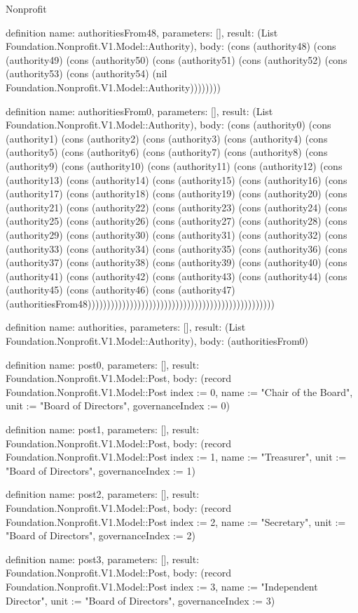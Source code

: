 \begin{lexlean}{Nonprofit}
\begin{semanticmodule}
definition{
  name: authoritiesFrom48,
  parameters: [],
  result: (List Foundation.Nonprofit.V1.Model::Authority),
  body: (cons (authority48) (cons (authority49) (cons (authority50) (cons (authority51) (cons (authority52) (cons (authority53) (cons (authority54) (nil Foundation.Nonprofit.V1.Model::Authority))))))))
}

definition{
  name: authoritiesFrom0,
  parameters: [],
  result: (List Foundation.Nonprofit.V1.Model::Authority),
  body: (cons (authority0) (cons (authority1) (cons (authority2) (cons (authority3) (cons (authority4) (cons (authority5) (cons (authority6) (cons (authority7) (cons (authority8) (cons (authority9) (cons (authority10) (cons (authority11) (cons (authority12) (cons (authority13) (cons (authority14) (cons (authority15) (cons (authority16) (cons (authority17) (cons (authority18) (cons (authority19) (cons (authority20) (cons (authority21) (cons (authority22) (cons (authority23) (cons (authority24) (cons (authority25) (cons (authority26) (cons (authority27) (cons (authority28) (cons (authority29) (cons (authority30) (cons (authority31) (cons (authority32) (cons (authority33) (cons (authority34) (cons (authority35) (cons (authority36) (cons (authority37) (cons (authority38) (cons (authority39) (cons (authority40) (cons (authority41) (cons (authority42) (cons (authority43) (cons (authority44) (cons (authority45) (cons (authority46) (cons (authority47) (authoritiesFrom48)))))))))))))))))))))))))))))))))))))))))))))))))
}

definition{
  name: authorities,
  parameters: [],
  result: (List Foundation.Nonprofit.V1.Model::Authority),
  body: (authoritiesFrom0)
}

definition{
  name: post0,
  parameters: [],
  result: Foundation.Nonprofit.V1.Model::Post,
  body: (record Foundation.Nonprofit.V1.Model::Post {index := 0, name := "Chair of the Board", unit := "Board of Directors", governanceIndex := 0})
}

definition{
  name: post1,
  parameters: [],
  result: Foundation.Nonprofit.V1.Model::Post,
  body: (record Foundation.Nonprofit.V1.Model::Post {index := 1, name := "Treasurer", unit := "Board of Directors", governanceIndex := 1})
}

definition{
  name: post2,
  parameters: [],
  result: Foundation.Nonprofit.V1.Model::Post,
  body: (record Foundation.Nonprofit.V1.Model::Post {index := 2, name := "Secretary", unit := "Board of Directors", governanceIndex := 2})
}

definition{
  name: post3,
  parameters: [],
  result: Foundation.Nonprofit.V1.Model::Post,
  body: (record Foundation.Nonprofit.V1.Model::Post {index := 3, name := "Independent Director", unit := "Board of Directors", governanceIndex := 3})
}


\end{semanticmodule}
\end{lexlean}
